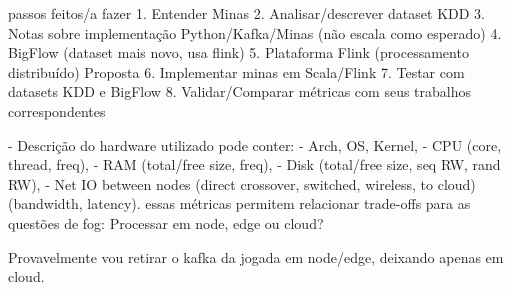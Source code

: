 passos feitos/a fazer
1. Entender Minas
2. Analisar/descrever dataset KDD
3. Notas sobre implementação Python/Kafka/Minas (não escala como esperado)
4. BigFlow (dataset mais novo, usa flink)
5. Plataforma Flink (processamento distribuído)
Proposta
6. Implementar minas em Scala/Flink
7. Testar com datasets KDD e BigFlow
8. Validar/Comparar métricas com seus trabalhos correspondentes

- Descrição do hardware utilizado pode conter:
    - Arch, OS, Kernel,
    - CPU (core, thread, freq),
    - RAM (total/free size, freq),
    - Disk (total/free size, seq RW, rand RW),
    - Net IO between nodes (direct crossover, switched, wireless, to cloud) (bandwidth, latency).
essas métricas permitem relacionar trade-offs para as questões de fog: Processar em node, edge ou cloud?

Provavelmente vou retirar o kafka da jogada em node/edge, deixando apenas em cloud.
